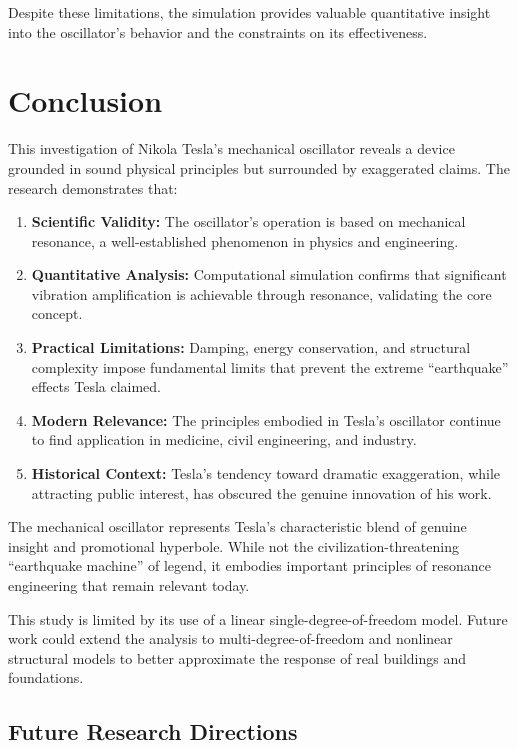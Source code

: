 \documentclass[12pt,a4paper]{article}
\begin{document}
Despite these limitations, the simulation provides valuable quantitative insight into the oscillator's behavior and the constraints on its effectiveness.

\section*{Conclusion}

This investigation of Nikola Tesla's mechanical oscillator reveals a device grounded in sound physical principles but surrounded by exaggerated claims. The research demonstrates that:

\begin{enumerate}
\item \textbf{Scientific Validity:} The oscillator's operation is based on mechanical resonance, a well-established phenomenon in physics and engineering.

\item \textbf{Quantitative Analysis:} Computational simulation confirms that significant vibration amplification is achievable through resonance, validating the core concept.

\item \textbf{Practical Limitations:} Damping, energy conservation, and structural complexity impose fundamental limits that prevent the extreme ``earthquake'' effects Tesla claimed.

\item \textbf{Modern Relevance:} The principles embodied in Tesla's oscillator continue to find application in medicine, civil engineering, and industry.

\item \textbf{Historical Context:} Tesla's tendency toward dramatic exaggeration, while attracting public interest, has obscured the genuine innovation of his work.
\end{enumerate}

The mechanical oscillator represents Tesla's characteristic blend of genuine insight and promotional hyperbole. While not the civilization-threatening ``earthquake machine'' of legend, it embodies important principles of resonance engineering that remain relevant today.

This study is limited by its use of a linear single-degree-of-freedom model. Future work could extend the analysis to multi-degree-of-freedom and nonlinear structural models to better approximate the response of real buildings and foundations.

\subsection*{Future Research Directions}
\end{document}
